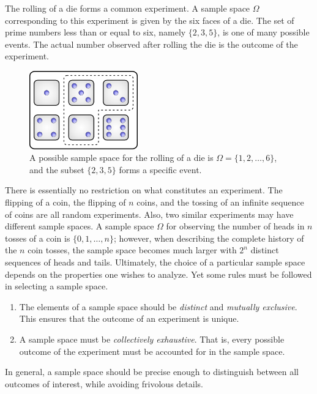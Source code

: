 \begin{example}
The rolling of a die forms a common experiment.
A sample space $\Omega$ corresponding to this experiment is given by the six faces of a die.
The set of prime numbers less than or equal to six, namely $\{ 2, 3, 5 \}$, is one of many possible events.
The actual number observed after rolling the die is the outcome of the experiment.

\begin{figure}[htb!]
\begin{center}
\includegraphics[height=3.38cm]{Figures/2Chapter/dices}
\caption{A possible sample space for the rolling of a die is $\Omega = \{ 1, 2, \ldots, 6 \}$, and the subset $\{2, 3, 5 \}$ forms a specific event.}
\end{center}
\end{figure}
\end{example}

There is essentially no restriction on what constitutes an experiment.
The flipping of a coin, the flipping of $n$ coins, and the tossing of an infinite sequence of coins are all random experiments.
Also, two similar experiments may have different sample spaces.
A sample space $\Omega$ for observing the number of heads in $n$ tosses of a coin is $\{ 0, 1, \ldots, n \}$; however, when describing the complete history of the $n$ coin tosses, the sample space becomes much larger with $2^n$ distinct sequences of heads and tails.
Ultimately, the choice of a particular sample space depends on the properties one wishes to analyze.
Yet some rules must be followed in selecting a sample space.
\begin{enumerate}
\item The elements of a sample space should be \emph{distinct} and \emph{mutually exclusive}.
This ensures that the outcome of an experiment is unique.
\item A sample space must be \emph{collectively exhaustive}.
That is, every possible outcome of the experiment must be accounted for in the sample space.
\end{enumerate}
In general, a sample space should be precise enough to distinguish between all outcomes of interest, while avoiding frivolous details.

